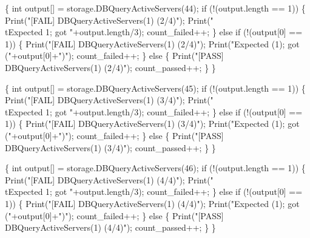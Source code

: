 \documentclass{article}
\def\nwendcode{\endtrivlist \endgroup}
\let\nwdocspar=\par
\begin{document}
\{
  int output[] = storage.DBQueryActiveServers(44);
  if (!(output.length == 1)) \{
    Print("[FAIL] DBQueryActiveServers(1) (2/4)");
    Print("\\tExpected 1; got "+output.length/3);
    count_failed++;
  \} else if (!(output[0] == 1)) \{
    Print("[FAIL] DBQueryActiveServers(1) (2/4)");
    Print("Expected (1); got ("+output[0]+")");
    count_failed++;
  \} else \{
    Print("[PASS] DBQueryActiveServers(1) (2/4)");
    count_passed++;
  \}
\}
\nwendcode{}\nwdocspar
\nwenddocs{}\endmoddef{}
\{
  int output[] = storage.DBQueryActiveServers(45);
  if (!(output.length == 1)) \{
    Print("[FAIL] DBQueryActiveServers(1) (3/4)");
    Print("\\tExpected 1; got "+output.length/3);
    count_failed++;
  \} else if (!(output[0] == 1)) \{
    Print("[FAIL] DBQueryActiveServers(1) (3/4)");
    Print("Expected (1); got ("+output[0]+")");
    count_failed++;
  \} else \{
    Print("[PASS] DBQueryActiveServers(1) (3/4)");
    count_passed++;
  \}
\}
\nwendcode{}\nwdocspar
\nwenddocs{}\endmoddef{}
\{
  int output[] = storage.DBQueryActiveServers(46);
  if (!(output.length == 1)) \{
    Print("[FAIL] DBQueryActiveServers(1) (4/4)");
    Print("\\tExpected 1; got "+output.length/3);
    count_failed++;
  \} else if (!(output[0] == 1)) \{
    Print("[FAIL] DBQueryActiveServers(1) (4/4)");
    Print("Expected (1); got ("+output[0]+")");
    count_failed++;
  \} else \{
    Print("[PASS] DBQueryActiveServers(1) (4/4)");
    count_passed++;
  \}
\}
\nwendcode{}\nwdocspar
\end{document}
